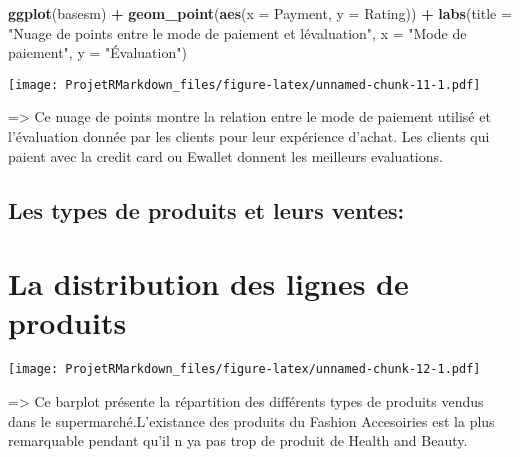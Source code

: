 \documentclass[
]{article}
\newenvironment{Shaded}{\begin{snugshade}}{\end{snugshade}}
\newcommand{\AttributeTok}[1]{\textcolor[rgb]{0.13,0.29,0.53}{#1}}
\newcommand{\FunctionTok}[1]{\textcolor[rgb]{0.13,0.29,0.53}{\textbf{#1}}}
\newcommand{\NormalTok}[1]{#1}
\newcommand{\SpecialCharTok}[1]{\textcolor[rgb]{0.81,0.36,0.00}{\textbf{#1}}}
\newcommand{\StringTok}[1]{\textcolor[rgb]{0.31,0.60,0.02}{#1}}
\begin{document}
\begin{Shaded}
\begin{Highlighting}[]
\FunctionTok{ggplot}\NormalTok{(basesm) }\SpecialCharTok{+}
  \FunctionTok{geom\_point}\NormalTok{(}\FunctionTok{aes}\NormalTok{(}\AttributeTok{x =}\NormalTok{ Payment, }\AttributeTok{y =}\NormalTok{ Rating)) }\SpecialCharTok{+}
  \FunctionTok{labs}\NormalTok{(}\AttributeTok{title =} \StringTok{"Nuage de points entre le mode de paiement et l\textquotesingle{}évaluation"}\NormalTok{,}
       \AttributeTok{x =} \StringTok{"Mode de paiement"}\NormalTok{,}
       \AttributeTok{y =} \StringTok{"Évaluation"}\NormalTok{)}
\end{Highlighting}
\end{Shaded}

\texttt{[image: ProjetRMarkdown\_files/figure-latex/unnamed-chunk-11-1.pdf]}

=\textgreater{} Ce nuage de points montre la relation entre le mode de
paiement utilisé et l'évaluation donnée par les clients pour leur
expérience d'achat. Les clients qui paient avec la credit card ou
Ewallet donnent les meilleurs evaluations.

\hypertarget{les-types-de-produits-et-leurs-ventes}{%
\subsection{Les types de produits et leurs
ventes:}\label{les-types-de-produits-et-leurs-ventes}}

\hypertarget{la-distribution-des-lignes-de-produits}{%
\section{La distribution des lignes de
produits}\label{la-distribution-des-lignes-de-produits}}

\begin{Shaded}
\end{Shaded}

\texttt{[image: ProjetRMarkdown\_files/figure-latex/unnamed-chunk-12-1.pdf]}

=\textgreater{} Ce barplot présente la répartition des différents types
de produits vendus dans le supermarché.L'existance des produits du
Fashion Accesoiries est la plus remarquable pendant qu'il n ya pas trop
de produit de Health and Beauty.
\end{document}
